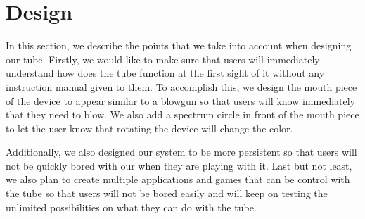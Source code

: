 \section{Design}\label{sec:design}

In this section, we describe the points that we take into account when designing our tube. Firstly, we would like to make sure that users will immediately understand how does the tube function at the first sight of it without any instruction manual given to them. To accomplish this, we design the mouth piece of the device to appear similar to a blowgun so that users will know immediately that they need to blow. We also add a spectrum circle in front of the mouth piece to let the user know that rotating the device will change the color.

Additionally, we also designed our system to be more persistent so that users will not be quickly bored with our \tube when they are playing with it. Last but not least, we also plan to create multiple applications and games that can be control with the tube so that users will not be bored easily and will keep on testing the unlimited possibilities on what they can do with the tube.
